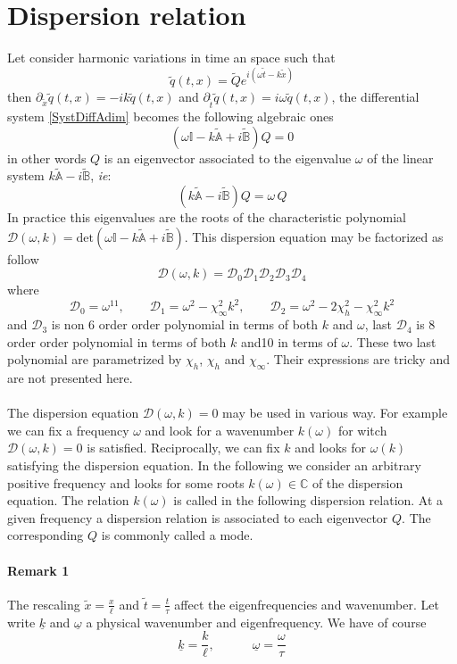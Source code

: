 \documentclass[
10pt, %
a4paper, %
oneside, %
headinclude,footinclude, %
table
]{scrartcl}
\begin{document}
\section{Dispersion relation}
Let consider harmonic variations in time an space such that 
$$
\tilde{q}(t,x)=\tilde{Q}e^{i(\omega \tilde{t}-k\tilde{x})}
$$
then $\partial_{\tilde{x}}\tilde{q}(t,x)=-ik\tilde{q}(t,x)$ and 
$\partial_{\tilde{t}}\tilde{q}(t,x)=i\omega\tilde{q}(t,x)$, the differential system 
\eqref{SystDiffAdim} becomes the following algebraic ones
\begin{equation}
\left(\omega\mathbb{I} -k\tilde{\mathbb{A}}+i\tilde{\mathbb{B}}\right)Q=0
\end{equation}
in other words $Q$ is an eigenvector associated to the eigenvalue $\omega$ of the linear system $k\tilde{\mathbb{A}}-i\tilde{\mathbb{B}}$, \textit{ie}:
$$
\left(k\tilde{\mathbb{A}}-i\tilde{\mathbb{B}}\right)Q=\omega \, Q
$$
In practice this eigenvalues are the roots of the characteristic polynomial $\mathcal{D}(\omega,k)=\textrm{det}(\omega\mathbb{I} -k\tilde{\mathbb{A}}+i\tilde{\mathbb{B}})$. This dispersion equation may be factorized as follow
$$
\mathcal{D}(\omega,k)=\mathcal{D}_{0}\mathcal{D}_{1}\mathcal{D}_{2}\mathcal{D}_{3}\mathcal{D}_{4}
$$
where 
$$
\mathcal{D}_{0}=\omega^{11}, \quad\quad
\mathcal{D}_{1}=\omega^2-\chi_{\infty}^2k^2, \quad\quad
\mathcal{D}_{2}=\omega^2-2 \chi_{h}^2-\chi_{\infty}^2k^2
$$
and $\mathcal{D}_{3}$ is non 6 order order polynomial in terms of both $k$ and $\omega$, last $\mathcal{D}_{4}$  is 8 order order polynomial in terms of both $k$ and10 in terms of $\omega$. These two last polynomial are parametrized by $\chi_{h}$, $\chi_{h}$ and $\chi_{\infty}$. Their expressions are tricky and are not presented here. \\
\\
The dispersion equation $\mathcal{D}(\omega,k)=0$ may be used in various way. For example we can fix a frequency $\omega$ and look for a wavenumber $k(\omega)$ for witch $\mathcal{D}(\omega,k)=0$ is satisfied. Reciprocally, we can fix $k$ and looks for $\omega(k)$ satisfying the dispersion equation. In the following we consider an arbitrary positive frequency and looks for some roots $k(\omega)\in \mathbb{C}$ of the dispersion equation.  The relation $k(\omega)$ is called in the following dispersion relation. At a given frequency a dispersion relation is associated to each eigenvector $Q$. The corresponding $Q$ is commonly called a mode. \\
\paragraph{\textbf{Remark 1}} The rescaling $\tilde{x}=\frac{x}{\ell}$ and $\tilde{t}=\frac{t}{\tau}$ affect the eigenfrequencies and wavenumber. Let write $\underline{k}$ and $\underline{\omega}$ a physical wavenumber and eigenfrequency.  We have of course 
$$
\underline{k}=\frac{k}{\ell}, \quad\quad\quad
\underline{\omega}=\frac{\omega}{\tau}
$$
\end{document}
